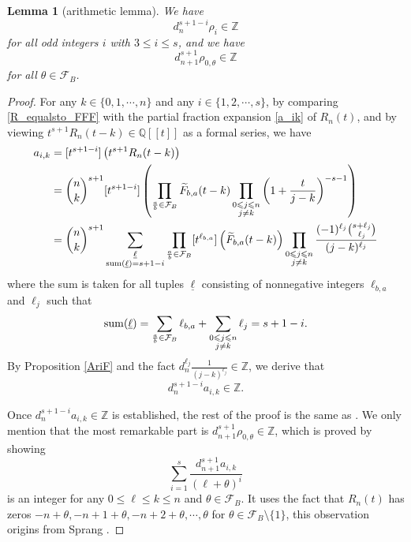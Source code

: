 \documentclass[11pt]{amsart}
\newtheorem{lemma}[theorem]{Lemma}
\numberwithin{equation}{section}
\begin{document}
\smallskip
\begin{lemma}[arithmetic lemma]\label{LemmaAri}
We have
\[d_n^{s+1-i} \rho_{i} \in \mathbb{Z}\]
for all odd integers $i$ with $3 \leqslant i \leqslant s$, and we have
\[d_{n+1}^{s+1} \rho_{0,\theta} \in \mathbb{Z}\]
for all $\theta \in \mathcal{F}_B$.
\end{lemma}

\begin{proof}
For any $k \in \{ 0,1,\cdots,n \}$ and any $i \in \{ 1,2,\cdots,s \}$, by comparing \eqref{R_equalsto_FFF} with the partial fraction expansion \eqref{a_ik} of $R_n(t)$, and by viewing $t^{s+1}R_n(t-k) \in \mathbb{Q}[[t]]$ as a formal series, we have
\begin{align*}
a_{i,k} &= [t^{s+1-i}]\left( t^{s+1}R_{n}(t-k) \right) \\
&= \binom{n}{k}^{s+1} [t^{s+1-i}]\left( \prod_{\frac{a}{b} \in \mathcal{F}_{B}} \widetilde{F}_{b,a}(t-k) \prod_{\substack{0 \leqslant j \leqslant n \\ j \neq k}} \left(1+ \frac{t}{j-k} \right)^{-s-1} \right) \\
&= \binom{n}{k}^{s+1} \sum_{\substack{\underline{\ell} \\ {\rm sum}(\underline{\ell}) = s+1-i}} \prod_{\frac{a}{b} \in \mathcal{F}_{B}} [t^{\ell_{b,a}}]\left( \widetilde{F}_{b,a}(t-k) \right) \prod_{\substack{0 \leqslant j \leqslant n \\ j \neq k}} \frac{(-1)^{\ell_j}\binom{s+\ell_j}{\ell_j}}{(j-k)^{\ell_j}}
\end{align*}
where the sum is taken for all tuples $\underline{\ell}$ consisting of nonnegative integers $\ell_{b,a}$ and $\ell_j$ such that
\[ {\rm sum}(\underline{\ell}) = \sum_{\frac{a}{b} \in \mathcal{F}_{B}} \ell_{b,a} + \sum_{\substack{0 \leqslant j \leqslant n \\ j \neq k}} \ell_j = s+1-i . \]
By Proposition \ref{AriF} and the fact $d_n^{\ell_j} \frac{1}{(j-k)^{\ell_j}} \in \mathbb{Z}$, we derive that
\[ d_{n}^{s+1-i} a_{i,k} \in \mathbb{Z}. \]

Once $d_{n}^{s+1-i} a_{i,k} \in \mathbb{Z}$ is established, the rest of the proof is the same as \cite[Lemma 2]{FSZ2019}. We only mention that the most remarkable part is $d_{n+1}^{s+1} \rho_{0,\theta} \in \mathbb{Z}$, which is proved by showing
\[ \sum_{i=1}^{s} \frac{d_{n+1}^{s+1} a_{i,k}}{(\ell + \theta)^{i}} \]
is an integer for any $0 \leqslant \ell \leqslant k \leqslant n$ and $\theta \in \mathcal{F}_B$. It uses the fact that $R_n(t)$ has zeros $-n+\theta, -n+1+\theta, -n+2 +\theta ,\cdots, \theta$ for $\theta \in \mathcal{F}_B \setminus \{1\}$, this observation origins from Sprang \cite[Lemma 1.4]{Sp18}.

\end{proof}
\bigskip
\end{document}
